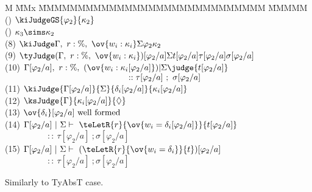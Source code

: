 \begin{flushleft}
\begin{tabbing}
M \= MMx \= MMMMMMMMMMMMMMMMMMMMMMMMMMMMM \= MMMMM  \kill
\>	() 
		\> $\kiJudgeGS{\varphi_2}{\kappa_2}$
		\> 
\\[1ex]
\>	() 
		\> $\kappa_3 \sims \kappa_2$
		\> 
\\[1ex]
\>	(8) 	\> $\kiJudge
			{\Gamma, \ r : \%, \ \ov{w_i : \kappa_i}}
			{\Sigma}
			{\varphi_2}
			{\kappa_2}$
		\> 
\\[1ex]
\>	(9)	\> $\tyJudge
			{(\Gamma, \ r : \%, \ \ov{w_i : \kappa_i})[\varphi_2/a]}
			{\Sigma}
			{t[\varphi_2/a]}
			{\tau[\varphi_2/a]}
			{\sigma[\varphi_2/a]}$
		\> 
\\[1ex]
\>	(10)	\> ${\Gamma[\varphi_2/a], \ r : \%, \ (\ov{w_i : \kappa_i[\varphi_2/a]})} \arrowvert {\Sigma} 
				\judge 	{t[\varphi_2/a]}$
\\[0.2ex]
\>		\> $\hspace{14.5em} :: {\tau[\varphi_2/a]} \ ; \ 
		    {\sigma[\varphi_2/a]}$
		\> 
\\[1ex]
\>	(11)	\> $\kiJudge
			{\Gamma[\varphi_2/a]}
			{\Sigma}
			{\delta_i[\varphi_2/a]}
			{\kappa_i[\varphi_2/a]}$
		\> 
\\[1ex]
\>	(12)	\> $\ksJudge
			{\Gamma}
			{\kappa_i[\varphi_2/a]}
			{\Diamond}$
		\> 
\\[1ex]
\>	(13)	\> $\ov{\delta_i}[\varphi_2/a] \ \text{well formed}$
		\> 
\\[1ex]
\>	(14)	\> ${\Gamma[\varphi_2/a]} \ 
			\arrowvert \ {\Sigma}
			\vdash \ {\teLetR{r}{\ov{w_i = \delta_i[\varphi_2/a]}}{t[\varphi_2/a]}}$
\\[0.2ex]
\>		\> $\hspace{5em}
			:: \ {\tau[\varphi_2/a]} \ ; {\sigma[\varphi_2/a]}$
		\> 
\\[1ex]
\>	(15)	\> ${\Gamma[\varphi_2/a]} \
			\arrowvert \ {\Sigma}
			\vdash \ {(\teLetR{r}{\ov{w_i = \delta_i}}{t})[\varphi_2/a]}$
\\[0.2ex]
\>		\> $\hspace{5em}
			:: \ {\tau[\varphi_2/a]} \ ; {\sigma[\varphi_2/a]}$
		\> 
\end{tabbing}

\bigskip

Similarly to TyAbsT case.


\end{flushleft}
